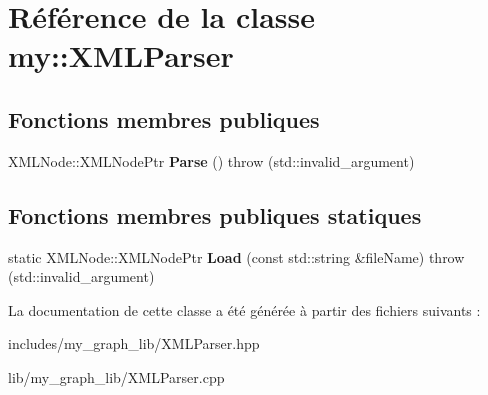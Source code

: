 \hypertarget{classmy_1_1XMLParser}{}\section{Référence de la classe my\+:\+:X\+M\+L\+Parser}
\label{classmy_1_1XMLParser}
\subsection*{Fonctions membres publiques}
\begin{DoxyCompactItemize}
\item 
\mbox{\label{classmy_1_1XMLParser_a2999b1e15aaee08928f4cd5404b4888c}} 
X\+M\+L\+Node\+::\+X\+M\+L\+Node\+Ptr {\bfseries Parse} ()  throw (std\+::invalid\+\_\+argument)
\end{DoxyCompactItemize}
\subsection*{Fonctions membres publiques statiques}
\begin{DoxyCompactItemize}
\item 
\mbox{\label{classmy_1_1XMLParser_a5984adfdbe69d035f00814ba69a573d0}} 
static X\+M\+L\+Node\+::\+X\+M\+L\+Node\+Ptr {\bfseries Load} (const std\+::string \&file\+Name)  throw (std\+::invalid\+\_\+argument)
\end{DoxyCompactItemize}


La documentation de cette classe a été générée à partir des fichiers suivants \+:\begin{DoxyCompactItemize}
\item 
includes/my\+\_\+graph\+\_\+lib/X\+M\+L\+Parser.\+hpp\item 
lib/my\+\_\+graph\+\_\+lib/X\+M\+L\+Parser.\+cpp\end{DoxyCompactItemize}
